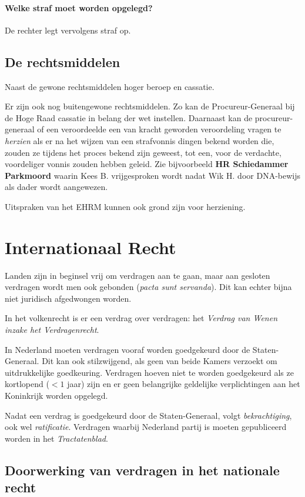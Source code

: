 \documentclass{article}
\begin{document}
\paragraph{Welke straf moet worden opgelegd?} De rechter legt vervolgens straf
op.

\subsection{De rechtsmiddelen}

Naast de gewone rechtsmiddelen hoger beroep en cassatie.

Er zijn ook nog buitengewone rechtsmiddelen. Zo kan de Procureur-Generaal bij
de Hoge Raad cassatie in belang der wet instellen. Daarnaast kan de
procureur-generaal of een veroordeelde een van kracht geworden veroordeling
vragen te \emph{herzien} als er na het wijzen van een strafvonnis dingen bekend
worden die, zouden ze tijdens het proces bekend zijn geweest, tot een, voor de
verdachte, voordeliger vonnis zouden hebben geleid. Zie bijvoorbeeld \textbf{
HR Schiedammer Parkmoord} waarin Kees B. vrijgesproken wordt nadat Wik H. door
DNA-bewijs als dader wordt aangewezen.

Uitspraken van het EHRM kunnen ook grond zijn voor herziening.

\section{Internationaal Recht} \label{h15}

Landen zijn in beginsel vrij om verdragen aan te gaan, maar aan gesloten
verdragen wordt men ook gebonden (\emph{pacta sunt servanda}). Dit kan echter
bijna niet juridisch afgedwongen worden.

In het volkenrecht is er een verdrag over verdragen: het \emph{Verdrag van
Wenen inzake het Verdragenrecht}.

In Nederland moeten verdragen vooraf worden goedgekeurd door de
Staten-Generaal. Dit kan ook stilzwijgend, als geen van beide Kamers verzoekt
om uitdrukkelijke goedkeuring. Verdragen hoeven niet te worden goedgekeurd als
ze kortlopend ($<1$ jaar) zijn en er geen belangrijke geldelijke verplichtingen
aan het Koninkrijk worden opgelegd.

Nadat een verdrag is goedgekeurd door de Staten-Generaal, volgt
\emph{bekrachtiging}, ook wel \emph{ratificatie}. Verdragen waarbij Nederland
partij is moeten gepubliceerd worden in het \emph{Tractatenblad}.

\subsection{Doorwerking van verdragen in het nationale recht}
\end{document}
